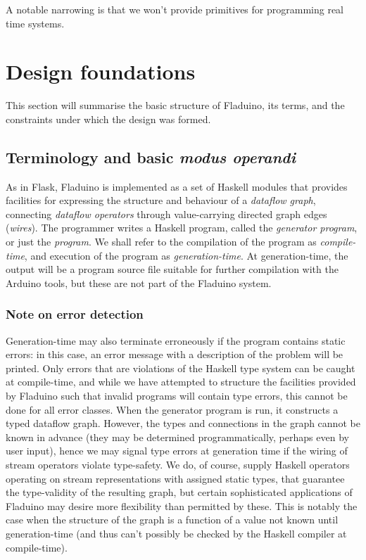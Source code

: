 \documentclass[a4paper, oneside, final]{memoir}
\begin{document}
A notable narrowing is that we won't provide primitives for
programming real time systems.

\section{Design foundations}

This section will summarise the basic structure of Fladuino, its
terms, and the constraints under which the design was formed.

\subsection{Terminology and basic \textit{modus operandi}}

As in Flask, Fladuino is implemented as a set of Haskell modules that
provides facilities for expressing the structure and behaviour of a
\textit{dataflow graph}, connecting \textit{dataflow operators}
through value-carrying directed graph edges (\textit{wires}).
 The
programmer writes a Haskell program, called the \textit{generator
  program}, or just the \textit{program}.  We shall refer to the
compilation of the program as \textit{compile-time}, and execution of
the program as \textit{generation-time}.  At generation-time, the
output will be a program source file suitable for further compilation
with the Arduino tools, but these are not part of the Fladuino system.

\subsubsection{Note on error detection}

Generation-time may also terminate erroneously if the program contains
static errors: in this case, an error message with a description of
the problem will be printed.  Only errors that are violations of the
Haskell type system can be caught at compile-time, and while we have
attempted to structure the facilities provided by Fladuino such that
invalid programs will contain type errors, this cannot be done for all
error classes.  When the generator program is run, it constructs a
typed dataflow graph.  However, the types and connections in the graph
cannot be known in advance (they may be determined
pro\-gram\-mati\-cally, perhaps even by user input), hence we may
signal type errors at generation time if the wiring of stream
operators violate type-safety.  We do, of course, supply Haskell
operators operating on stream representations with assigned static
types, that guarantee the type-validity of the resulting graph, but
certain sophisticated applications of Fladuino may desire more
flexibility than permitted by these.  This is notably the case when
the structure of the graph is a function of a value not known until
generation-time (and thus can't possibly be checked by the Haskell
compiler at compile-time).
\end{document}
